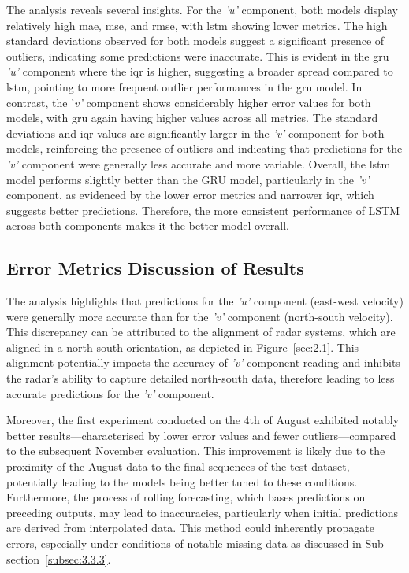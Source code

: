 The analysis reveals several insights. For the \textit{'u'} component, both models display relatively high \acrshort{mae}, \acrshort{mse}, and \acrshort{rmse}, with \acrshort{lstm} showing lower metrics. The high standard deviations observed for both models suggest a significant presence of outliers, indicating some predictions were inaccurate. This is evident in the \acrshort{gru} \textit{'u'} component where the \acrshort{iqr} is higher, suggesting a broader spread compared to \acrshort{lstm}, pointing to more frequent outlier performances in the \acrshort{gru} model. In contrast, the '\textit{v'} component shows considerably higher error values for both models, with \acrshort{gru} again having higher values across all metrics. The standard deviations and \acrshort{iqr} values are significantly larger in the \textit{'v'} component for both models, reinforcing the presence of outliers and indicating that predictions for the \textit{'v'} component were generally less accurate and more variable. Overall, the \acrshort{lstm} model performs slightly better than the GRU model, particularly in the \textit{'v'} component, as evidenced by the lower error metrics and narrower \acrshort{iqr}, which suggests better predictions. Therefore, the more consistent performance of LSTM across both components makes it the better model overall. 

\subsection{Error Metrics Discussion of Results}
\label{subsec:4.1.2}

The analysis highlights that predictions for the \textit{'u'} component (east-west velocity) were generally more accurate than for the \textit{'v'} component (north-south velocity). This discrepancy can be attributed to the alignment of radar systems, which are aligned in a north-south orientation, as depicted in Figure~\ref{sec:2.1}. This alignment potentially impacts the accuracy of \textit{'v'} component reading and inhibits the radar's ability to capture detailed north-south data, therefore leading to less accurate predictions for the \textit{'v'} component. 

Moreover, the first experiment conducted on the 4th of August exhibited notably better results—characterised by lower error values and fewer outliers—compared to the subsequent November evaluation. This improvement is likely due to the proximity of the August data to the final sequences of the test dataset, potentially leading to the models being better tuned to these conditions. Furthermore, the process of rolling forecasting, which bases predictions on preceding outputs, may lead to inaccuracies, particularly when initial predictions are derived from interpolated data. This method could inherently propagate errors, especially under conditions of notable missing data as discussed in Sub-section~\ref{subsec:3.3.3}.

